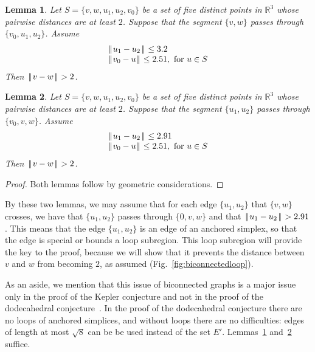 \documentclass[11pt]{amsart}
\newcommand{\ring}[1]{\mathbb{#1}}
\def\text{\hbox}
\def\|{{\hskip0.1em|\hskip-0.15em|\hskip0.1em}}
\newtheorem{lemma}{Lemma}
\begin{document}
\begin{lemma}\label{lemma:prelim}  Let $S=\{v,w,u_1,u_2,v_0\}$ be a set of five distinct points in $\ring{R}^3$ whose
pairwise distances are at least $2$. Suppose that the segment $\{v,w\}$ passes through
$\{v_0,u_1,u_2\}$. Assume
$$
\begin{array}{lll}
\|u_1-u_2\|\le 3.2\\
\|v_0-u\|\le 2.51,\text{ for } u \in S\\
\end{array}
$$
Then $\|v-w\|>2$.
\end{lemma}

\begin{lemma}\label{lemma:291}  Let $S=\{v,w,u_1,u_2,v_0\}$ be a set of five distinct points in $\ring{R}^3$ whose
pairwise distances are at least $2$. Suppose that the segment $\{u_1,u_2\}$ passes through
$\{v_0,v,w\}$. Assume
$$
\begin{array}{lll}
\|u_1-u_2\|\le 2.91\\
\|v_0-u\|\le 2.51,\text{ for } u \in S\\
\end{array}
$$
Then $\|v-w\|>2$.
\end{lemma}



\begin{proof} Both lemmas follow by geometric considerations.
\end{proof}

By these two lemmas, we may assume that for each edge $\{u_1,u_2\}$ that $\{v,w\}$ crosses,
we have that $\{u_1,u_2\}$ passes through $\{0,v,w\}$ and that $\|u_1-u_2\|>2.91$.  This means that the edge $\{u_1,u_2\}$ is an edge of an anchored simplex,
so that the edge is special or bounds a loop subregion.
This loop subregion will provide the key to the proof, because we will show
that it prevents the distance between $v$ and $w$ from becoming $2$,
as assumed  (Fig.~\ref{fig:biconnectedloop}).


As an aside, we mention that this issue of biconnected graphs is a major issue only in the 
proof of the Kepler conjecture and not
in the proof of the dodecahedral conjecture~\cite{Hales:2008:Dodec}.  In the proof of the dodecahedral conjecture there are no loops of anchored simplices, and without loops there are no difficulties: edges of length at most
$\sqrt8$ can be be used instead of the set $E'$.  Lemmas~\ref{lemma:prelim} and~\ref{lemma:291} suffice.
\end{document}
